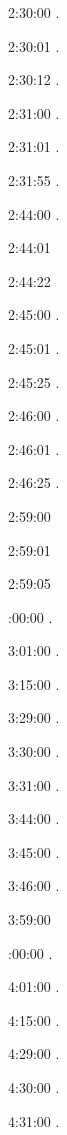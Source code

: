 2:30:00 .

2:30:01 .

2:30:12 .

2:31:00 .

2:31:01 .

2:31:55 .

2:44:00 .

2:44:01 

2:44:22 

2:45:00 .

2:45:01 .

2:45:25 .

2:46:00 .

2:46:01 .

2:46:25 .

2:59:00 

2:59:01 

2:59:05 

:00:00 .

3:01:00 . 

3:15:00 . 

3:29:00 . 

3:30:00 .

3:31:00 .

3:44:00 .

3:45:00 .

3:46:00 .

3:59:00 

:00:00 .

4:01:00 . 

4:15:00 . 

4:29:00 . 

4:30:00 .

4:31:00 .

